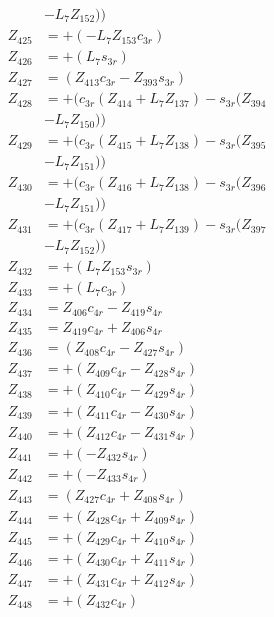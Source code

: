 \begin{multicols}{2}
\begin{align}
&- L_7Z_{152})) \nonumber \\
Z_{425} &= + (-L_7Z_{153}c_{3r}) \nonumber \\
Z_{426} &= + (L_7s_{3r}) \nonumber \\
Z_{427} &= (Z_{413}c_{3r} - Z_{393}s_{3r}) \nonumber \\
Z_{428} &= + (c_{3r}(Z_{414} + L_7Z_{137}) - s_{3r}(Z_{394}  \nonumber \\
&- L_7Z_{150})) \nonumber \\
Z_{429} &= + (c_{3r}(Z_{415} + L_7Z_{138}) - s_{3r}(Z_{395}  \nonumber \\
&- L_7Z_{151})) \nonumber \\
Z_{430} &= + (c_{3r}(Z_{416} + L_7Z_{138}) - s_{3r}(Z_{396}  \nonumber \\
&- L_7Z_{151})) \nonumber \\
Z_{431} &= + (c_{3r}(Z_{417} + L_7Z_{139}) - s_{3r}(Z_{397}  \nonumber \\
&- L_7Z_{152})) \nonumber \\
Z_{432} &= + (L_7Z_{153}s_{3r}) \nonumber \\
Z_{433} &= + (L_7c_{3r}) \nonumber \\
Z_{434} &= Z_{406}c_{4r} - Z_{419}s_{4r} \nonumber \\
Z_{435} &= Z_{419}c_{4r} + Z_{406}s_{4r} \nonumber \\
Z_{436} &= (Z_{408}c_{4r} - Z_{427}s_{4r}) \nonumber \\
Z_{437} &= + (Z_{409}c_{4r} - Z_{428}s_{4r}) \nonumber \\
Z_{438} &= + (Z_{410}c_{4r} - Z_{429}s_{4r}) \nonumber \\
Z_{439} &= + (Z_{411}c_{4r} - Z_{430}s_{4r}) \nonumber \\
Z_{440} &= + (Z_{412}c_{4r} - Z_{431}s_{4r}) \nonumber \\
Z_{441} &= + (-Z_{432}s_{4r}) \nonumber \\
Z_{442} &= + (-Z_{433}s_{4r}) \nonumber \\
Z_{443} &= (Z_{427}c_{4r} + Z_{408}s_{4r}) \nonumber \\
Z_{444} &= + (Z_{428}c_{4r} + Z_{409}s_{4r}) \nonumber \\
Z_{445} &= + (Z_{429}c_{4r} + Z_{410}s_{4r}) \nonumber \\
Z_{446} &= + (Z_{430}c_{4r} + Z_{411}s_{4r}) \nonumber \\
Z_{447} &= + (Z_{431}c_{4r} + Z_{412}s_{4r}) \nonumber \\
Z_{448} &= + (Z_{432}c_{4r}) \nonumber \\ 

\end{align}
\end{multicols}
